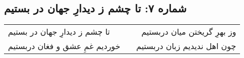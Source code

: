\begin{center}
\section*{شماره ۷: تا چشم ز دیدارِ جهان در بستیم}
\label{sec:007}
\begin{longtable}{l p{0.5cm} r}
تا چشم ز دیدارِ جهان در بستیم
&&
وز بهرِ گریختن میان دربستیم
\\
خوردیم غمِ عشق و فغان دربستیم
&&
چون اهل ندیدیم زبان دربستیم
\\
\end{longtable}
\end{center}

